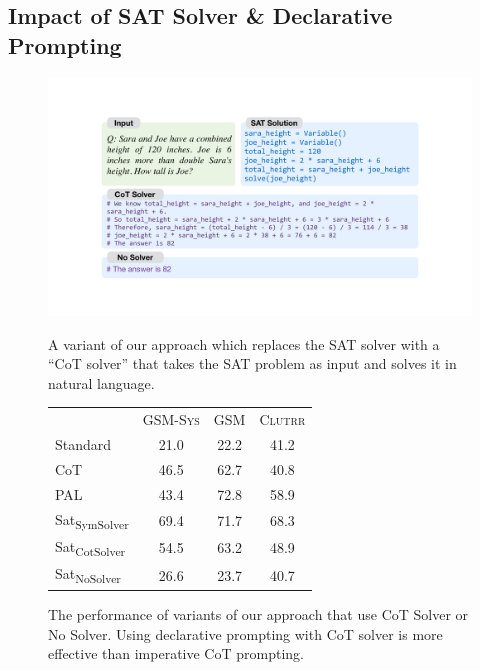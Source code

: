 \documentclass{article}
\theoremstyle{definition}
\newcommand{\gsm}{\textsc{GSM}}
\newcommand{\gsmsys}{\textsc{GSM-Sys}}
\newcommand{\clutrr}{\textsc{Clutrr}}
\begin{document}
\subsection{Impact of SAT Solver \& Declarative Prompting}
\label{sec:disentangle}
\begin{figure}
\begin{minipage}{0.48\textwidth}

  \begin{center}
    \includegraphics[width=\linewidth,trim=200 130 200 130,clip]{figures/cot_solver.pdf}
  \end{center}
  \vspace{-.1in}
  \caption{A variant of our approach which replaces the SAT solver with a ``CoT solver'' that takes the SAT problem as input and solves it in natural language.}
  \label{fig:cot_solver}
  \end{minipage}
\hspace{0.01\textwidth}
  \begin{minipage}{0.48\textwidth}
\captionsetup{type=table}
  \caption{The performance of variants of our approach that use CoT Solver or No Solver. Using declarative prompting with CoT solver is more effective than imperative CoT prompting.}
  \label{tab:cot_solver}
  \vspace{0.1em}
  \small
  \centering
  \begin{tabular}{lccc}
    \toprule
         & \gsmsys{} & \gsm{} & \clutrr{} \\
        \cmidrule{2-4} 
    \sc Standard            & 21.0 & 22.2 & 41.2\\
    \sc CoT                 & 46.5 & 62.7 & 40.8 \\
    \sc PAL   & 43.4 &  72.8 & 58.9 \\
    \cmidrule{2-4}
     \sc Sat\textsubscript{SymSolver} &  69.4 & 71.7 &  68.3 \\
     \sc Sat\textsubscript{CotSolver} &  54.5 & 63.2 & 48.9 \\
     \sc Sat\textsubscript{NoSolver} & 26.6 & 23.7 &  40.7\\
    \bottomrule
  \end{tabular}
\end{minipage}
\end{figure}
\end{document}
